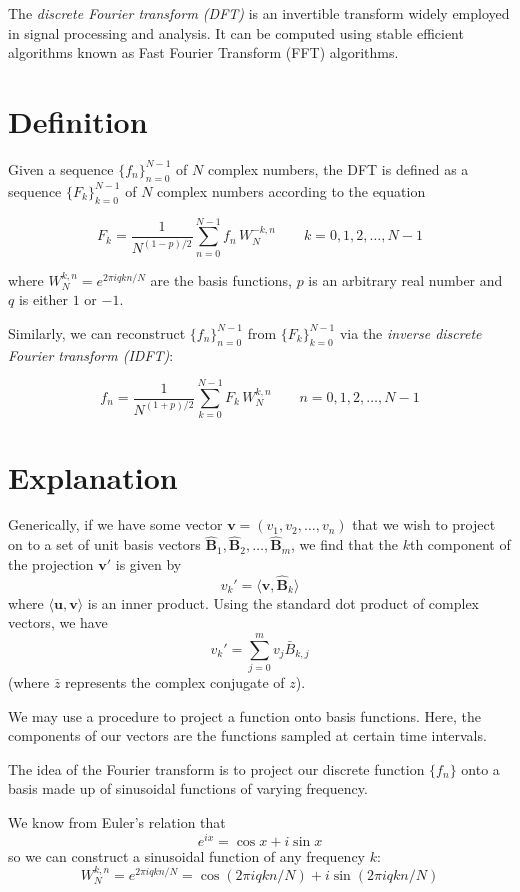 \documentclass[12pt]{article}
\newcommand{\vv}[1]{\ensuremath{\mathbf{#1}}}
\newcommand{\uv}[1]{\ensuremath{\mathbf{\hat{#1}}}}
\begin{document}
The \emph{discrete Fourier transform (DFT)} is an invertible transform widely employed in signal processing and analysis. It can be computed using stable efficient algorithms known as Fast Fourier Transform (FFT) algorithms.

\section{Definition}

Given a sequence $\{f_n\}_{n=0}^{N-1}$ of $N$ complex numbers, the DFT is defined as a sequence $\{F_k\}_{k=0}^{N-1}$ of $N$ complex numbers according to the equation

$$F_k = \frac{1}{N^{(1-p)/2}} \sum_{n=0}^{N-1} f_n\,W_N^{-k,n}\quad \quad k=0, 1, 2, \dots, N-1$$

where $W_N^{k,n}=e^{2\pi i q k n/N}$ are the basis functions, $p$ is an arbitrary real number and $q$ is either $1$ or $-1$.

Similarly, we can reconstruct $\{f_n\}_{n=0}^{N-1}$ from $\{F_k\}_{k=0}^{N-1}$ via the \emph{inverse discrete Fourier transform (IDFT)}:

$$f_n = \frac{1}{N^{(1+p)/2}} \sum_{k=0}^{N-1} F_k\,W_N^{k,n}\quad \quad n = 0, 1, 2, \dots, N-1$$

\section{Explanation}

Generically, if we have some vector $\vv{v} = (v_1, v_2, \dots , v_n)$ that we wish to project on to a set of unit basis vectors ${ \uv{B}_1, \uv{B}_2, \dots , \uv{B}_m }$, we find that the $k$th component of the projection $\vv{v}'$ is given by
$$v_k' = \langle \vv{v}, \uv{B}_k \rangle$$
where $\langle \vv{u},\vv{v} \rangle$ is an inner product.  Using the standard dot product of complex vectors, we have
$$v_k' = \sum_{j=0}^m v_j\bar{B}_{k,j}$$
(where $\bar{z}$ represents the complex conjugate of $z$).

We may use a  procedure to project a function onto basis functions.  Here, the components of our vectors are the functions sampled at certain time intervals. 

The idea of the Fourier transform is to project our discrete function $\{f_n\}$ onto a basis made up of sinusoidal functions of varying frequency.

We know from Euler's relation that
$$e^{ix} = \cos x + i\sin x$$
so we can construct a sinusoidal function of any frequency $k$:
$$W_N^{k,n} = e^{2\pi i q k n/N} = \cos (2\pi i q k n/N) + i\sin(2\pi i q k n/N)$$
\end{document}
